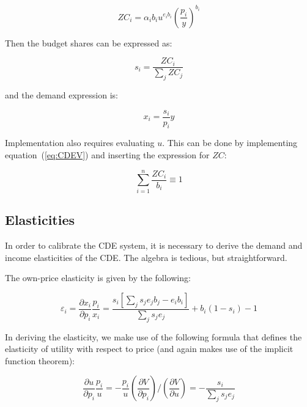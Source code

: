 \begin{equation}
\mathit{ZC}_i = \alpha_i b_i u^{e_i b_i}\left( \frac{p_i}{y}\right)^{b_i}
\end{equation}

\noindent Then the budget shares can be expressed as:

\begin{equation}
s_i = \frac{\mathit{ZC}_i}{\sum_j{\mathit{ZC}_j}}
\end{equation}

\noindent and the demand expression is:

\begin{equation}
x_i = \frac{s_i}{p_i} y
\end{equation}

\noindent Implementation also requires evaluating $u$. This can be
done by implementing equation~(\ref{eq:CDEV}) and inserting the
expression for $\mathit{ZC}$:

\begin{equation}
\sum_{i=1}^{n}{\frac {\mathit{ZC}_i} {b_i} } \equiv 1
\end{equation}

\subsection{Elasticities}

In order to calibrate the CDE system, it is necessary to derive the demand and income elasticities
of the CDE. The algebra is tedious, but straightforward.

The own-price elasticity is given by the following:

\begin{equation}
\label{eq:EPS0}
\varepsilon_i = \frac{\partial x_i} {\partial p_i} \frac{p_i}{x_i} =
\frac{\displaystyle s_i \left[\sum_j {s_j e_j b_j} - e_i b_i  \right]} 
{\displaystyle \sum_j {s_j e_j}}
+ b_i \left( 1 - s_i \right) - 1
\end{equation}

\noindent In deriving the elasticity, we make use of the following formula that defines the
elasticity of utility with respect to price (and again makes use of the implicit function theorem):

\begin{equation}
\frac{{\partial u}}{{\partial {p_i}}}\frac{{{p_i}}}{u} =  - \frac{{{p_i}}}{u}\left(
{\frac{{\partial V}}{{\partial {p_i}}}} \right)/\left( {\frac{{\partial V}}{{\partial u}}} \right)
=  - \frac{{{s_i}}}{{\sum\limits_j {{s_j}{e_j}} }}
\end{equation}

